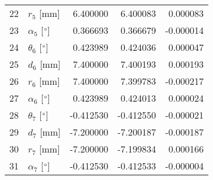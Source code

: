 \documentclass{standalone}%
\begin{document}
\begin{tabular}{llrrr}
22 &              $r_{5}$ [mm] &   6.400000 &   6.400083 &   0.000083 \\
23 &  $\alpha_{5}$ [$\degree$] &   0.366693 &   0.366679 &  -0.000014 \\
24 &  $\theta_{6}$ [$\degree$] &   0.423989 &   0.424036 &   0.000047 \\
25 &              $d_{6}$ [mm] &   7.400000 &   7.400193 &   0.000193 \\
26 &              $r_{6}$ [mm] &   7.400000 &   7.399783 &  -0.000217 \\
27 &  $\alpha_{6}$ [$\degree$] &   0.423989 &   0.424013 &   0.000024 \\
28 &  $\theta_{7}$ [$\degree$] &  -0.412530 &  -0.412550 &  -0.000021 \\
29 &              $d_{7}$ [mm] &  -7.200000 &  -7.200187 &  -0.000187 \\
30 &              $r_{7}$ [mm] &  -7.200000 &  -7.199834 &   0.000166 \\
31 &  $\alpha_{7}$ [$\degree$] &  -0.412530 &  -0.412533 &  -0.000004 \\
\bottomrule
\end{tabular}
%
\end{document}
